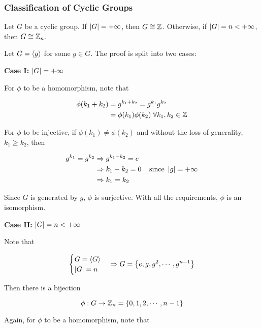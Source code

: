 \documentclass[a4paper,12pt]{article}
\begin{document}
\subsubsection{Classification of Cyclic Groups}
\begin{thm}
  Let $G$ be a cyclic group. If $\left| G\right|=+\infty$, then $G\cong\mathbb{Z}$. Otherwise, if $\left| G\right|=n<+\infty$, then $G\cong\mathbb{Z}_{n}$.\n

  \prf Let $G=\left\langle g\right\rangle$ for some $g\in G$. The proof is split into two cases:

  \begin{alist}
    \item \textbf{Case I: }$\left| G\right|=+\infty$\n

    For $\phi$ to be a homomorphism, note that

    $$\begin{aligned}[t]
      \phi(k_{1}+k_{2})&=g^{k_{1}+k_{2}}=g^{k_{1}}g^{k_{2}}\\
      &=\phi(k_{1})\phi(k_{2})\;\forall k_{1},k_{2}\in\mathbb{Z}
    \end{aligned}$$\s

    For $\phi$ to be injective, if $\phi(k_{1})\neq\phi(k_{2})$ and without the loss of generality, $k_{1}\geq k_{2}$, then

    $$\begin{aligned}[t]
      g^{k_{1}}=g^{k_{2}}&\Rightarrow g^{k_{1}-k_{2}}=e\\
      &\Rightarrow k_{1}-k_{2}=0\;\;\;\;\text{since }\left| g\right|=+\infty\\
      &\Rightarrow k_{1}=k_{2}
    \end{aligned}$$\s

    Since $G$ is generated by $g$, $\phi$ is surjective. With all the requirements, $\phi$ is an isomorphism.
    \item \textbf{Case II: }$\left| G\right|=n<+\infty$\n

    Note that

    $$\begin{cases}
      G=\left\langle G\right\rangle\\
      \left| G\right|=n
    \end{cases}\Rightarrow G=\left\{ e,g,g^{2},\cdots,g^{n-1}\right\}$$\s

    Then there is a bijection

    $$\phi:G\to\mathbb{Z}_{n}=\left\{ 0,1,2,\cdots,n-1\right\}$$\s

    Again, for $\phi$ to be a homomorphism, note that


\end{alist}
\end{thm}
\end{document}
